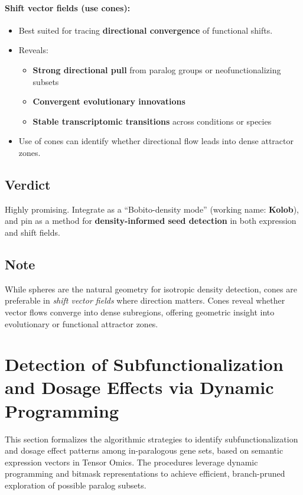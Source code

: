 \documentclass{article}
\begin{document}
\paragraph{Shift vector fields (use cones):}
\begin{itemize}
  \item Best suited for tracing \textbf{directional convergence} of functional shifts.
  \item Reveals:
    \begin{itemize}
      \item \textbf{Strong directional pull} from paralog groups or neofunctionalizing subsets
      \item \textbf{Convergent evolutionary innovations}
      \item \textbf{Stable transcriptomic transitions} across conditions or species
    \end{itemize}
  \item Use of cones can identify whether directional flow leads into dense attractor zones.
\end{itemize}

\subsection{Verdict}
Highly promising. Integrate as a ``Bobito-density mode'' (working name: \textbf{Kolob}), and pin as a method for \textbf{density-informed seed detection} in both expression and shift fields.

\subsection{Note}
While spheres are the natural geometry for isotropic density detection, cones are preferable in \emph{shift vector fields} where direction matters. Cones reveal whether vector flows converge into dense subregions, offering geometric insight into evolutionary or functional attractor zones.

\section{Detection of Subfunctionalization and Dosage Effects via Dynamic Programming}

This section formalizes the algorithmic strategies to identify subfunctionalization and dosage effect patterns among in-paralogous gene sets, based on semantic expression vectors in Tensor Omics. The procedures leverage dynamic programming and bitmask representations to achieve efficient, branch-pruned exploration of possible paralog subsets.
\end{document}

